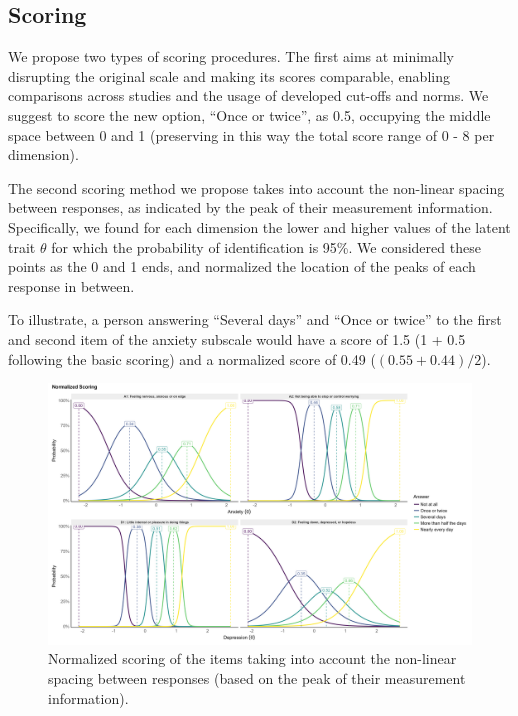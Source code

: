 \documentclass[
  man,floatsintext]{apa6}
\begin{document}
\hypertarget{scoring}{%
\subsection{Scoring}\label{scoring}}

We propose two types of scoring procedures. The first aims at
minimally disrupting the original scale and making its scores comparable, enabling comparisons across studies and the usage of developed cut-offs and norms. We suggest to score the new option, ``Once or twice'', as 0.5, occupying the middle space between 0 and 1 (preserving in this way the total score range of 0 - 8 per dimension).

The second scoring method we propose takes into account the non-linear spacing between responses, as indicated by the peak of their measurement information. Specifically, we found for each dimension the lower and higher values of the latent trait \(\theta\) for which the probability of identification is 95\%. We considered these points as the 0 and 1 ends, and normalized the location of the peaks of each response in between.

To illustrate, a person answering ``Several days'' and ``Once or twice'' to the first and second item of the anxiety subscale would have a score of 1.5 (1 + 0.5 following the basic scoring) and a normalized score of 0.49 (\((0.55 + 0.44) / 2\)).

\begin{figure}
\includegraphics[width=1\linewidth]{../figures/figure2} \caption{Normalized scoring of the items taking into account the non-linear spacing between responses (based on the peak of their measurement information).}\label{fig:unnamed-chunk-3}
\end{figure}
\end{document}
